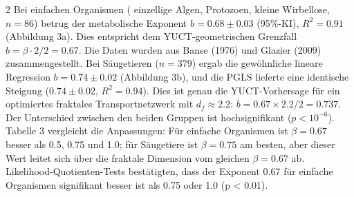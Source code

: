 \documentclass[11pt,a4paper]{article}
\newcommand{\betaf}{\beta}
\newcommand{\df}{d_f}
\begin{document}
\begin{multicols}{2}
		Bei einfachen Organismen ( einzellige Algen, Protozoen, kleine Wirbellose, \(n = 86\)) betrug der metabolische Exponent \(b = 0.68 \pm 0.03\) (95\%-KI), \(R^2 = 0.91\) (Abbildung 3a). Dies entspricht dem YUCT-geometrischen Grenzfall \(b = \betaf \cdot 2/2 = 0.67\). Die Daten wurden aus Banse (1976) \cite{Banse1976} und Glazier (2009) \cite{Glazier2009} zusammengestellt. Bei Säugetieren (\(n = 379\)) ergab die gewöhnliche lineare Regression \(b = 0.74 \pm 0.02\) (Abbildung 3b), und die PGLS lieferte eine identische Steigung (\(0.74 \pm 0.02\), \(R^2 = 0.94\)). Dies ist genau die YUCT-Vorhersage für ein optimiertes fraktales Transportnetzwerk mit \(\df \approx 2.2\): \(b = 0.67 \times 2.2 / 2 = 0.737\). Der Unterschied zwischen den beiden Gruppen ist hochsignifikant (\(p < 10^{-6}\)). Tabelle 3 vergleicht die Anpassungen: Für einfache Organismen ist \(\beta = 0.67\) besser als 0.5, 0.75 und 1.0; für Säugetiere ist \(\beta = 0.75\) am besten, aber dieser Wert leitet sich über die fraktale Dimension vom gleichen \(\beta = 0.67\) ab. Likelihood-Quotienten-Tests bestätigten, dass der Exponent 0.67 für einfache Organismen signifikant besser ist als 0.75 oder 1.0 (p < 0.01).
		

\end{multicols}
\end{document}

